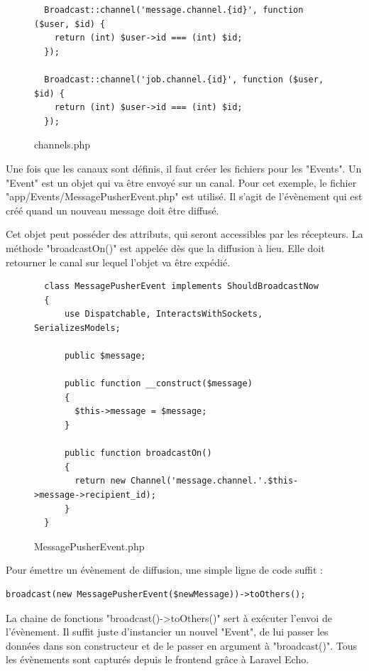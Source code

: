 \documentclass[
    iai, %
    eai, %
]{heig-tb}
\begin{document}
\begin{figure}[h]
  \begin{verbatim}
  Broadcast::channel('message.channel.{id}', function ($user, $id) {
    return (int) $user->id === (int) $id;
  });

  Broadcast::channel('job.channel.{id}', function ($user, $id) {
    return (int) $user->id === (int) $id;
  });
  \end{verbatim}
  \caption{channels.php}
\end{figure}

Une fois que les canaux sont définis, il faut créer les fichiers pour les "Events". Un "Event" est un objet qui va être envoyé sur un canal. Pour cet exemple, le fichier "app/Events/MessagePusherEvent.php" est utilisé. Il s'agit de l'évènement qui est créé quand un nouveau message doit être diffusé.

\newpage
Cet objet peut posséder des attributs, qui seront accessibles par les récepteurs. La méthode "broadcastOn()" est appelée dès que la diffusion à lieu. Elle doit retourner le canal sur lequel l'objet va être expédié.

\begin{figure}[h]
  \begin{verbatim}
  class MessagePusherEvent implements ShouldBroadcastNow
  {
      use Dispatchable, InteractsWithSockets, SerializesModels;

      public $message;

      public function __construct($message)
      {
        $this->message = $message;
      }

      public function broadcastOn()
      {
        return new Channel('message.channel.'.$this->message->recipient_id);
      }
  }
  \end{verbatim}
  \caption{MessagePusherEvent.php}
\end{figure}

Pour émettre un évènement de diffusion, une simple ligne de code suffit :
\begin{verbatim}
broadcast(new MessagePusherEvent($newMessage))->toOthers();
\end{verbatim}

La chaine de fonctions "broadcast()->toOthers()" sert à exécuter l'envoi de l'évènement. Il suffit juste d'instancier un nouvel "Event", de lui passer les données dans son constructeur et de le passer en argument à "broadcast()". Tous les évènements sont capturés depuis le frontend grâce à Laravel Echo.
\end{document}
